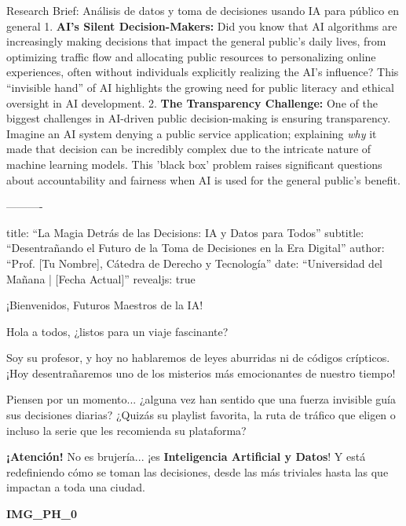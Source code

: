 \documentclass[aspectratio=169]{beamer}
\begin{document}
\begin{frame}[fragile]{Research Brief: Análisis de datos y toma de decisiones usando IA para público en general}
1.  \textbf{AI's Silent Decision-Makers:} Did you know that AI algorithms are increasingly making decisions that impact the general public's daily lives, from optimizing traffic flow and allocating public resources to personalizing online experiences, often without individuals explicitly realizing the AI's influence? This ``invisible hand'' of AI highlights the growing need for public literacy and ethical oversight in AI development.
2.  \textbf{The Transparency Challenge:} One of the biggest challenges in AI-driven public decision-making is ensuring transparency. Imagine an AI system denying a public service application; explaining \textit{why} it made that decision can be incredibly complex due to the intricate nature of machine learning models. This 'black box' problem raises significant questions about accountability and fairness when AI is used for the general public's benefit.

----------

\end{frame}



\begin{frame}[fragile]{}
title: ``La Magia Detrás de las Decisions: IA y Datos para Todos''
subtitle: ``Desentrañando el Futuro de la Toma de Decisiones en la Era Digital''
author: ``Prof. [Tu Nombre], Cátedra de Derecho y Tecnología''
date: ``Universidad del Mañana | [Fecha Actual]''
revealjs: true
\end{frame}



\begin{frame}[fragile]{¡Bienvenidos, Futuros Maestros de la IA!}


Hola a todos, ¿listos para un viaje fascinante?

Soy su profesor, y hoy no hablaremos de leyes aburridas ni de códigos crípticos. ¡Hoy desentrañaremos uno de los misterios más emocionantes de nuestro tiempo!

Piensen por un momento... ¿alguna vez han sentido que una fuerza invisible guía sus decisiones diarias? ¿Quizás su playlist favorita, la ruta de tráfico que eligen o incluso la serie que les recomienda su plataforma?

\textbf{¡Atención!} No es brujería... ¡es \textbf{Inteligencia Artificial y Datos}! Y está redefiniendo cómo se toman las decisiones, desde las más triviales hasta las que impactan a toda una ciudad.

\textbf{IMG\_PH\_0}

\end{frame}
\end{document}

